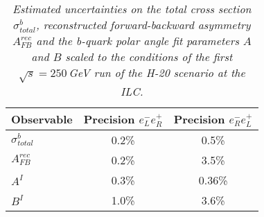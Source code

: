         \begin{table}
        \begin{center}
        \begin{tabular}{l c c}
        \hline
	Observable & Precision $e^-_Le^+_R$ & Precision $e^-_Re^+_L$\\
	\hline
	$\sigma^b_{total} $  & 0.2\%   & 0.5\% \\
	$A_{FB}^{rec} $& 0.2\%  & 3.5\% \\
	$A^I $ 			& 0.3\% & 0.36\% \\
	$B^I $ 			& 1.0\% & 3.6\% \\
		
        \hline
        \end{tabular}
        \end{center}
        \caption{\sl Estimated uncertainties on the total cross section $\sigma^b_{total}$, reconstructed forward-backward asymmetry $A_{FB}^{rec}$ and the b-quark polar angle fit parameters $A$ and $B$ scaled to the conditions of the first $\sqrt{s}=250$\,GeV run of the H-20 scenario at the ILC. }
        \label{table:bbbarfinal}
        \end{table}
